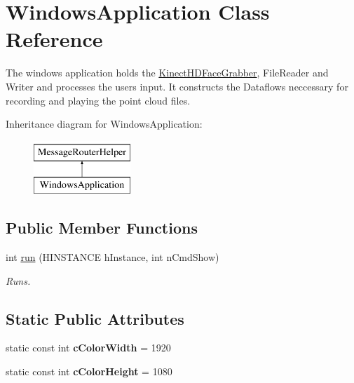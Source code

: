 \hypertarget{class_windows_application}{}\section{Windows\+Application Class Reference}
\label{class_windows_application}


The windows application holds the \hyperlink{class_kinect_h_d_face_grabber}{Kinect\+H\+D\+Face\+Grabber}, File\+Reader and Writer and processes the users input. It constructs the Dataflows neccessary for recording and playing the point cloud files.  


Inheritance diagram for Windows\+Application\+:\begin{figure}[H]
\begin{center}
\leavevmode
\includegraphics[height=2.000000cm]{class_windows_application}
\end{center}
\end{figure}
\subsection*{Public Member Functions}
\begin{DoxyCompactItemize}
\item 
int \hyperlink{class_windows_application_aca6c8269ede0ca09349775d794fcae13}{run} (H\+I\+N\+S\+T\+A\+N\+C\+E h\+Instance, int n\+Cmd\+Show)
\begin{DoxyCompactList}\small\item\em Runs. \end{DoxyCompactList}\end{DoxyCompactItemize}
\subsection*{Static Public Attributes}
\begin{DoxyCompactItemize}
\item 
\hypertarget{class_windows_application_a0071af7d0e9373da70e4341dc68dadfa}{}static const int {\bfseries c\+Color\+Width} = 1920\label{class_windows_application_a0071af7d0e9373da70e4341dc68dadfa}

\item 
\hypertarget{class_windows_application_ad3b9ee8c52ee395fe2a32ed26c5fd0b2}{}static const int {\bfseries c\+Color\+Height} = 1080\label{class_windows_application_ad3b9ee8c52ee395fe2a32ed26c5fd0b2}

\end{DoxyCompactItemize}
